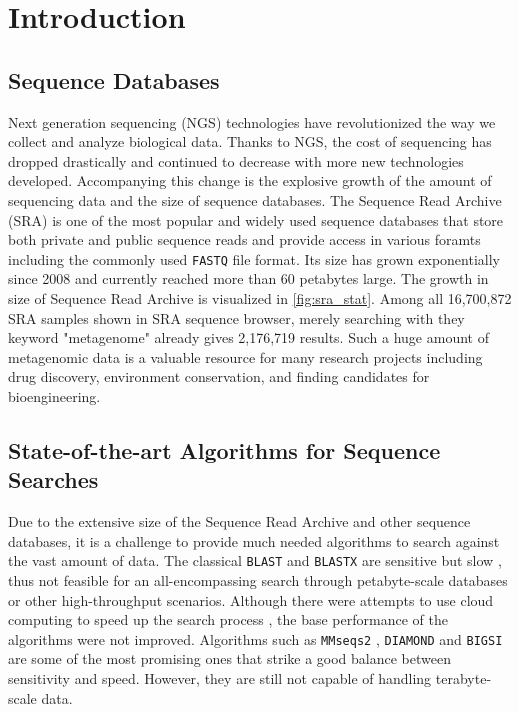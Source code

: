 
\chapter{Introduction}
\section{Sequence Databases}

Next generation sequencing (NGS) technologies have revolutionized the way we collect and analyze biological data.
Thanks to NGS, the cost of sequencing has dropped drastically and continued to decrease with more new technologies developed.
Accompanying this change is the explosive growth of the amount of sequencing data and the size of sequence databases.
The Sequence Read Archive (SRA) is one of the most popular and widely used sequence databases that store both private and public sequence reads and provide access in various foramts including the commonly used \texttt{FASTQ} file format.
Its size has grown exponentially since 2008 and currently reached more than 60 petabytes large.
The growth in size of Sequence Read Archive is visualized in \autoref{fig:sra_stat}.
Among all 16,700,872 SRA samples shown in SRA sequence browser, merely searching with they keyword "metagenome" already gives 2,176,719 results.
Such a huge amount of metagenomic data is a valuable resource for many research projects including drug discovery, environment conservation, and finding candidates for bioengineering.

\section{State-of-the-art Algorithms for Sequence Searches}

Due to the extensive size of the Sequence Read Archive and other sequence databases, it is a challenge to provide much needed algorithms to search against the vast amount of data.
The classical \texttt{BLAST} and \texttt{BLASTX} are sensitive but slow \cite{altschul_basic_1990}, thus not feasible for an all-encompassing search through petabyte-scale databases or other high-throughput scenarios.
Although there were attempts to use cloud computing to speed up the search process \cite{levi_searching_2018}, the base performance of the algorithms were not improved.
Algorithms such as \texttt{MMseqs2} \cite{steinegger_mmseqs2_2017}, \texttt{DIAMOND} \cite{buchfink_fast_2015} and \texttt{BIGSI} \cite{bradley_ultrafast_2019} are some of the most promising ones that strike a good balance between sensitivity and speed.
However, they are still not capable of handling terabyte-scale data.

